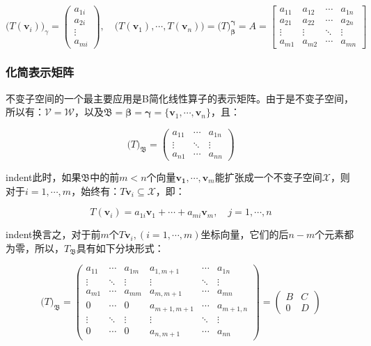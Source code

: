 \documentclass[UTF8,nofonts]{ctexart}
\begin{document}
\[\Big(T(\boldsymbol{v}_i)\Big)_\gamma=\begin{pmatrix}a_{1i}\\a_{2i}\\\vdots\\a_{mi}\end{pmatrix},\quad
\Big(T(\boldsymbol{v}_1),\cdots,T(\boldsymbol{v}_n)\Big)=\Big(T\Big)_{\boldsymbol{\beta}}^{\boldsymbol{\gamma}}=A=
\begin{bmatrix}a_{11}&a_{12}&\cdots&a_{1n}\\a_{21}&a_{22}&\cdots&a_{2n}\\\vdots&\vdots&\ddots&\vdots\\a_{m1}&a_{m2}&\cdots&a_{mn}\end{bmatrix}
\]

\subsubsection*{化简表示矩阵}

不变子空间的一个最主要应用是B简化线性算子的表示矩阵。由于是不变子空间，所以有：$\mathcal{V}=\mathcal{W}$，以及$\mathfrak{B}=\boldsymbol{\beta}=\boldsymbol{\gamma}=\{\boldsymbol{v}_1,\cdots,\boldsymbol{v}_n\}$，且：

\[
\Big(T\Big)_{\mathfrak{B}}=
\begin{pmatrix}a_{11}&\cdots&a_{1n}\\\vdots&\ddots&\vdots\\a_{n1}&\cdots&a_{nn}\end{pmatrix}
\]

indent此时，如果$\mathfrak{B}$中的前$m<n$个向量$\boldsymbol{v_1},\cdots,\boldsymbol{v}_m$能扩张成一个不变子空间$\mathcal{X}$，则对于$i=1,\cdots,m$，始终有：$T\boldsymbol{v}_i\subseteq\mathcal{X}$，即：

\[
T(\boldsymbol{v}_i)=a_{1i}\boldsymbol{v}_1+\cdots+a_{mi}\boldsymbol{v}_m,\quad j=1,\cdots,n
\]

indent换言之，对于前$m$个$T\boldsymbol{v}_i,(i=1,\cdots,m)$坐标向量，它们的后$n-m$个元素都为零，所以，$T_{\mathfrak{B}}$具有如下分块形式：


\[
\Big(T\Big)_{\mathfrak{B}}=
\begin{pmatrix}
a_{11} & \cdots & a_{1m} & a_{1,m+1} & \cdots & a_{1n} \\
\vdots & \ddots & \vdots & \vdots & \ddots & \vdots \\
a_{m1} & \cdots & a_{mm} & a_{m,m+1} & \cdots & a_{mn} \\
0 & \cdots & 0 & a_{m+1,m+1} & \cdots & a_{m+1,n} \\
\vdots & \ddots & \vdots & \vdots & \ddots & \vdots \\
0 & \cdots & 0 & a_{n,m+1} & \cdots & a_{nn}
\end{pmatrix}=
\begin{pmatrix}B & C \\ 0 & D\end{pmatrix}
\]
\end{document}
